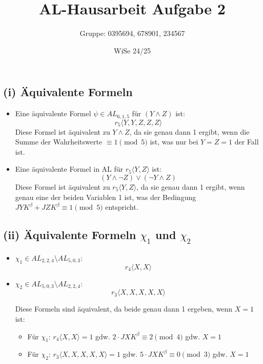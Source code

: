 \documentclass[12pt,a4paper]{article}
\title{AL-Hausarbeit Aufgabe 2}
\author{Gruppe: 0395694, 678901, 234567}
\date{WiSe 24/25}
\begin{document}
\maketitle

\subsection*{(i) Äquivalente Formeln}

\begin{itemize}
    \item Eine äquivalente Formel $\psi \in AL_{6,1,5}$ für $(Y \land Z)$ ist:
    \[
    r_5\langle Y, Y, Z, Z, Z \rangle
    \]
    Diese Formel ist äquivalent zu $Y \land Z$, da sie genau dann 1 ergibt, wenn die Summe der Wahrheitswerte $\equiv 1 \pmod{5}$ ist, was nur bei $Y=Z=1$ der Fall ist.
    
    \item Eine äquivalente Formel in AL für $r_5\langle Y,Z \rangle$ ist:
    \[
    (Y \land \neg Z) \lor (\neg Y \land Z)
    \]
    Diese Formel ist äquivalent zu $r_5\langle Y,Z \rangle$, da sie genau dann 1 ergibt, wenn genau eine der beiden Variablen 1 ist, was der Bedingung $JYK^\beta + JZK^\beta \equiv 1 \pmod{5}$ entspricht.
\end{itemize}

\subsection*{(ii) Äquivalente Formeln $\chi_1$ und $\chi_2$}

\begin{itemize}
    \item $\chi_1 \in AL_{2,2,4} \setminus AL_{5,0,3}$:
    \[
    r_4\langle X, X \rangle
    \]
    
    \item $\chi_2 \in AL_{5,0,3} \setminus AL_{2,2,4}$:
    \[
    r_3\langle X, X, X, X, X \rangle
    \]
    
    Diese Formeln sind äquivalent, da beide genau dann 1 ergeben, wenn $X=1$ ist:
    \begin{itemize}
        \item Für $\chi_1$: $r_4\langle X, X \rangle = 1$ gdw. $2\cdot JXK^\beta \equiv 2 \pmod{4}$ gdw. $X=1$
        \item Für $\chi_2$: $r_3\langle X, X, X, X, X \rangle = 1$ gdw. $5\cdot JXK^\beta \equiv 0 \pmod{3}$ gdw. $X=1$
    \end{itemize}
\end{itemize}
\end{document}
